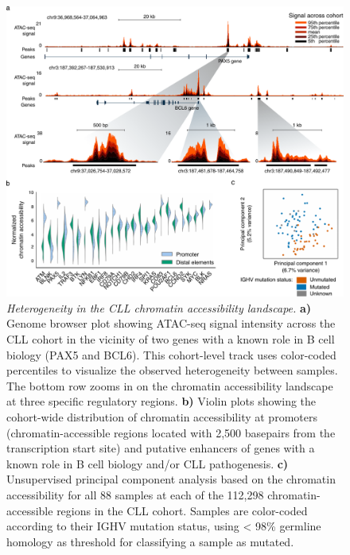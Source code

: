\documentclass[10pt,]{article}
\begin{document}
\begin{figure}
\centering
\includegraphics[width=1.000\hsize]{figures/Figure2.pdf}
\caption{\emph{Heterogeneity in the CLL chromatin accessibility
landscape.} \textbf{a)} Genome browser plot showing ATAC-seq signal
intensity across the CLL cohort in the vicinity of two genes with a
known role in B cell biology (PAX5 and BCL6). This cohort-level track
uses color-coded percentiles to visualize the observed heterogeneity
between samples. The bottom row zooms in on the chromatin accessibility
landscape at three specific regulatory regions. \textbf{b)} Violin plots
showing the cohort-wide distribution of chromatin accessibility at
promoters (chromatin-accessible regions located with 2,500 basepairs
from the transcription start site) and putative enhancers of genes with
a known role in B cell biology and/or CLL pathogenesis. \textbf{c)}
Unsupervised principal component analysis based on the chromatin
accessibility for all 88 samples at each of the 112,298
chromatin-accessible regions in the CLL cohort. Samples are color-coded
according to their IGHV mutation status, using \textless{} 98\% germline
homology as threshold for classifying a sample as
mutated.}\label{Figure2}
\end{figure}
\end{document}
